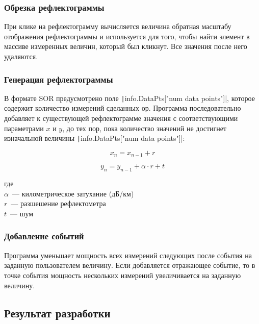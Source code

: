 \subsubsection{Обрезка рефлектограммы}

При клике на рефлектограмму вычисляется величина обратная масштабу отображения рефлектограммы и используется для того, чтобы найти элемент в массиве измеренных величин, который был кликнут. Все значения после него удаляются.

\subsubsection{Генерация рефлектограммы}

В формате SOR предусмотрено поле \texttt|info.DataPts["num data points"]|, которое содержит количество измерений сделанных \acrshort{ор}.
Программа последовательно добавляет к существующей рефлектограмме значения с соответствующими параметрами $x$ и $y$, до тех пор, пока количество значений не достигнет изначальной величины \texttt|info.DataPts["num data points"]|:

\begin{equation}
  \label{eqn:generate_x}
  x_n = x_{n-1} + r
\end{equation}

\begin{equation}
  \label{eqn:generate_y}
  y_n = y_{n-1} + \alpha \cdot r + t
\end{equation}

\noindent где \\
$\alpha$~--- километрическое затухание (дБ/км) \\
$r$~--- разшешение рефлектометра \\
$t$~--- шум

\subsubsection{Добавление событий}

Программа уменьшает мощность всех измерений следующих после события на заданную пользователем величину. 
Если добавляется отражающее событие, то в точке события мощность нескольких измерений увеличивается на заданную величину.

\subsection{Результат разработки}

